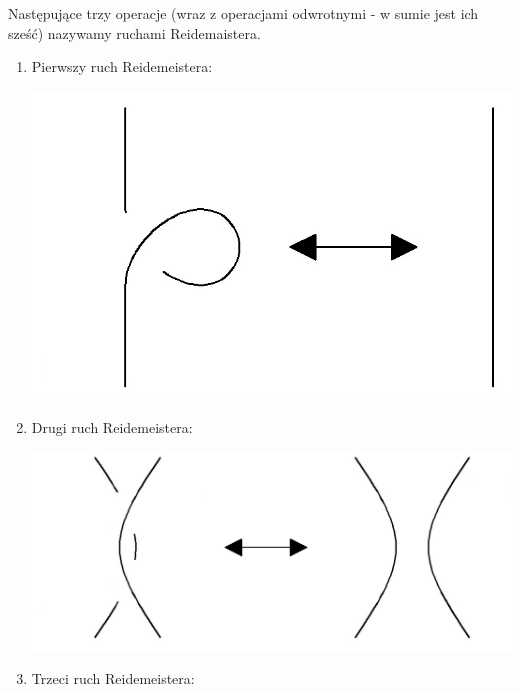 \begin{definicja}
 Następujące trzy operacje (wraz z operacjami odwrotnymi - w sumie jest ich sześć) nazywamy ruchami Reidemaistera.
 
	\begin{enumerate} 

\item Pierwszy ruch Reidemeistera: 
	
	\begin{minipage}{0.5\textwidth}
		\begin{center}
			\includegraphics[scale=0.15]{1/pictures/R1}
		\end{center}
	\end{minipage}
\item Drugi ruch Reidemeistera: 

	\begin{minipage}{0.5\textwidth}
		\begin{center}
			\includegraphics[scale=0.15]{1/pictures/R2}
		\end{center}
	\end{minipage}
	
\item Trzeci ruch Reidemeistera: 


\end{enumerate}
\end{definicja}
